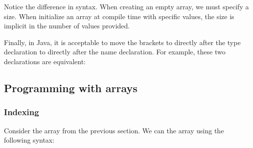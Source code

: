 \documentclass[letterpaper,10pt,english,openany,oneside]{sphinxmanual}
\begin{document}
\begin{sphinxVerbatim}[commandchars=\\\{\}]
\PYG{p}{[}\PYG{p}{]}   
  
                                                                
          
\end{sphinxVerbatim}

Notice the difference in syntax. When creating an empty array, we must specify a size. When initialize an array at compile time with specific values, the size is implicit in the number of values provided.

Finally, in Java, it is acceptable to move the brackets to directly after the type declaration to directly after the name declaration. For example, these two declarations are equivalent:

\begin{sphinxVerbatim}[commandchars=\\\{\}]
 \PYG{p}{[}\PYG{p}{]}
\PYG{p}{[}\PYG{p}{]} 
\end{sphinxVerbatim}


\subsection{Programming with arrays}
\label{\detokenize{arrays-arraylists:programming-with-arrays}}

\subsubsection{Indexing}
\label{\detokenize{arrays-arraylists:indexing}}
Consider the array  from the previous section. We can  the array using the following syntax:
\end{document}
